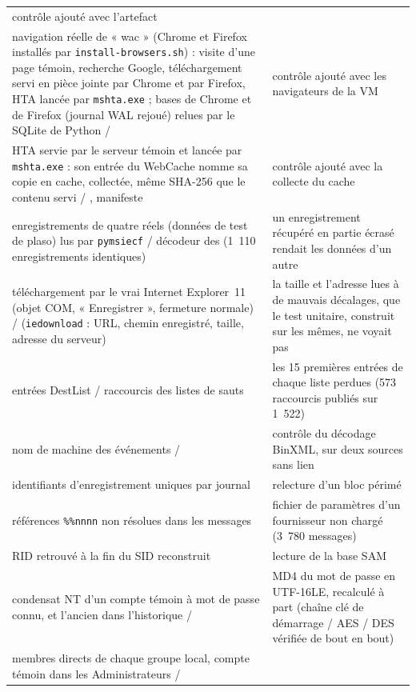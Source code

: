 \documentclass[11pt,a4paper,oneside]{report}
\begin{document}
\begin{longtable}{@{}L{6.6cm}L{8.4cm}@{}}
  contrôle ajouté avec l'artefact \\
navigation réelle de « wac » (Chrome et Firefox installés par
  \texttt{install-browsers.sh}) : visite d'une page témoin, recherche Google,
  téléchargement servi en pièce jointe par Chrome et par Firefox, HTA lancée
  par \texttt{mshta.exe} ; bases de Chrome et  de
  Firefox (journal WAL rejoué) relues par le SQLite de Python /
   &
  contrôle ajouté avec les navigateurs de la VM \\
HTA servie par le serveur témoin et lancée par \texttt{mshta.exe} : son
  entrée du WebCache nomme sa copie en cache, collectée, même SHA-256 que le
  contenu servi / , manifeste &
  contrôle ajouté avec la collecte du cache \\
enregistrements de quatre  réels (données de test de
  plaso) lus par \texttt{pymsiecf} / décodeur des 
  (1~110 enregistrements identiques) &
  un enregistrement récupéré en partie écrasé rendait les données d'un autre \\
téléchargement par le vrai Internet Explorer~11 (objet COM, « Enregistrer »,
  fermeture normale) /  (\texttt{iedownload} :
  URL, chemin enregistré, taille, adresse du serveur) &
  la taille et l'adresse lues à de mauvais décalages, que le test unitaire,
  construit sur les mêmes, ne voyait pas \\
entrées DestList / raccourcis des listes de sauts & les 15 premières entrées de
  chaque liste perdues (573 raccourcis publiés sur 1~522) \\
nom de machine des événements /  & contrôle du
  décodage BinXML, sur deux sources sans lien \\
identifiants d'enregistrement uniques par journal & relecture d'un bloc
  périmé \\
références \texttt{\%\%nnnn} non résolues dans les messages & fichier de
  paramètres d'un fournisseur non chargé (3~780 messages) \\
RID retrouvé à la fin du SID reconstruit & lecture de la base SAM \\
condensat NT d'un compte témoin à mot de passe connu, et l'ancien dans
  l'historique /  & MD4 du mot de passe en UTF-16LE,
  recalculé à part (chaîne clé de démarrage / AES / DES vérifiée de bout en bout) \\
membres directs de chaque groupe local, compte témoin dans les Administrateurs /

\end{longtable}
\end{document}
